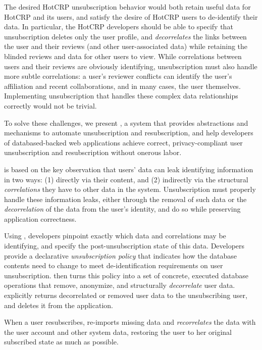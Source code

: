 The desired HotCRP unsubscription behavior would both retain useful data for HotCRP and its users,
and satisfy the desire of HotCRP users to de-identify their data. In particular, the HotCRP
developers should be able to specify that unsubscription deletes only the user profile, and
\emph{decorrelates} the links between the user and their reviews (and other user-associated data)
while retaining the blinded reviews and data for other users to view. While correlations between
users and their reviews are obviously identifying, unsubscription must also handle more subtle
correlations: a user's reviewer conflicts can identify the user's affiliation and recent
collaborations, and in many cases, the user themselves. Implementing unsubscription that handles
these complex data relationships correctly would not be trivial.

To solve these challenges, we present \sys, a system that provides
abstractions and mechanisms to automate unsubscription and resubscription, and 
help developers of databased-backed web applications achieve correct, privacy-compliant user
unsubscription and resubscription without onerous labor.

\sys is based on the key observation that users' data can leak identifying information in two ways:
(1) directly via their content, and (2) indirectly via the structural \emph{correlations} they have
to other data in the system. 
Unsubscription must properly handle these information leaks, either through the removal of such data
or the \emph{decorrelation} of the data from the user's identity, and do so while preserving
application correctness.

%
Using \sys, developers pinpoint exactly which data and correlations may be identifying, and
specify the post-unsubscription state of this data. Developers provide a declarative
\emph{unsubscription policy} that indicates how the database contents need to change to meet
de-identification requirements on user unsubscription.
%
\sys then turns this policy into a set of concrete, executed database operations that remove,
anonymize, and structurally \emph{decorrelate} user data. \sys explicitly returns decorrelated or
removed user data to the unsubscribing user, and deletes it from the application.
%

%
When a user resubscribes, \sys re-imports missing data and \emph{recorrelates} the data with the
user account and other system data, restoring the user to her original subscribed state as much as
possible.

